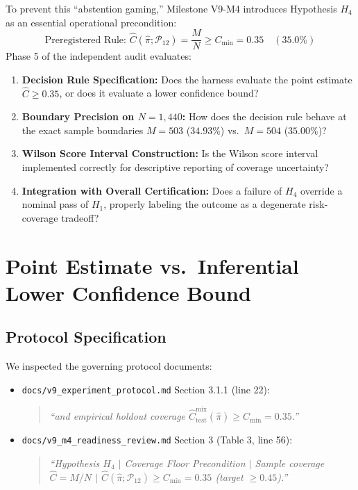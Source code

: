 \documentclass[10pt,a4paper]{article}
\begin{document}
To prevent this ``abstention gaming,'' Milestone V9-M4 introduces Hypothesis $H_4$ as an essential operational precondition:
\begin{equation}
\text{Preregistered Rule: } \hat{C}(\hat{\pi}; \mathcal{P}_{12}) = \frac{M}{N} \ge C_{\min} = 0.35 \quad (35.0\%)
\end{equation}
Phase 5 of the independent audit evaluates:
\begin{enumerate}
    \item \textbf{Decision Rule Specification:} Does the harness evaluate the point estimate $\hat{C} \ge 0.35$, or does it evaluate a lower confidence bound?
    \item \textbf{Boundary Precision on $N = 1,440$:} How does the decision rule behave at the exact sample boundaries $M = 503$ ($34.93\%$) vs.\ $M = 504$ ($35.00\%$)?
    \item \textbf{Wilson Score Interval Construction:} Is the Wilson score interval implemented correctly for descriptive reporting of coverage uncertainty?
    \item \textbf{Integration with Overall Certification:} Does a failure of $H_4$ override a nominal pass of $H_1$, properly labeling the outcome as a degenerate risk-coverage tradeoff?
\end{enumerate}

\section{Point Estimate vs.\ Inferential Lower Confidence Bound}

\subsection{Protocol Specification}
We inspected the governing protocol documents:
\begin{itemize}
    \item \texttt{docs/v9\_experiment\_protocol.md} Section 3.1.1 (line 22):
    \begin{quote}
    \textit{``and empirical holdout coverage $\hat{C}_{\text{test}}^{\text{mix}}(\hat{\pi}) \ge C_{\min} = 0.35$.''}
    \end{quote}
    \item \texttt{docs/v9\_m4\_readiness\_review.md} Section 3 (Table 3, line 56):
    \begin{quote}
    \textit{``Hypothesis $H_4$ $\mid$ Coverage Floor Precondition $\mid$ Sample coverage $\hat{C} = M / N$ $\mid$ $\hat{C}(\hat{\pi}; \mathcal{P}_{12}) \ge C_{\min} = 0.35$ (target $\ge 0.45$).''}
    \end{quote}
\end{itemize}
\end{document}
